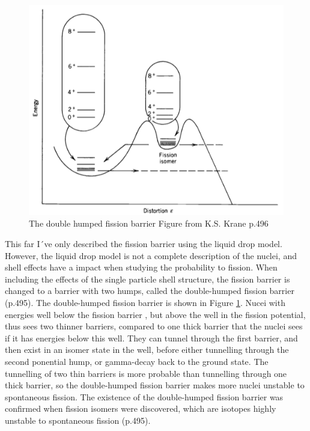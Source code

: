 \documentclass[]{article}
\begin{document}
  \begin{figure} [H]
	\centering
	\includegraphics[scale=0.7]{double_humped_fission_barrier.png}
	\caption{The double humped fission barrier Figure from K.S. Krane p.496 \cite{Krane1988}}
	\label{fig:double_humped_fission_barrier}
\end{figure}

\par
\vspace{3mm}

\noindent This far I´ve only described the fission barrier using the liquid drop model. However, the liquid drop model is not a complete description of the nuclei, and shell effects have a impact when studying the probability to fission. When including the effects of the single particle shell structure, the fission barrier is changed to a barrier with two humps, called the double-humped fission barrier \cite{Krane1988} (p.495). The double-humped fission barrier is shown in Figure \ref{fig:double_humped_fission_barrier}. Nucei with energies well below the fission barrier , but above the well in the fission potential, thus sees two thinner barriers, compared to one thick barrier that the nuclei sees if it has energies below this well. They can tunnel through the first barrier, and then exist in an isomer state in the well, before either tunnelling through the second ponential hump, or gamma-decay back to the ground state.  The tunnelling of two thin barriers is more probable than tunnelling through one thick barrier, so the double-humped fission barrier makes more nuclei unstable to spontaneous fission. The existence of the double-humped fission barrier was confirmed when fission isomers were discovered, which are isotopes highly unstable to spontaneous fission \cite{Krane1988} (p.495). 
\end{document}
